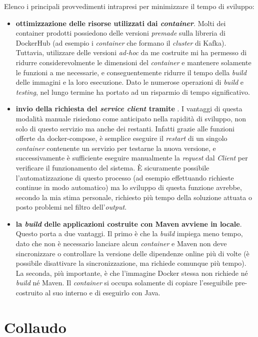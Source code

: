 \noindent
Elenco i principali provvedimenti intrapresi per minimizzare il tempo di sviluppo:
\begin{itemize}
  \item \textbf{ottimizzazione delle risorse utilizzati dai \textit{container}}.
  Molti dei container prodotti possiedono delle versioni \textit{premade} sulla libreria di DockerHub (ad esempio i \textit{container} che formano il \textit{cluster} di Kafka).
  Tuttavia, utilizzare delle versioni \textit{ad-hoc} da me costruite mi ha permesso di ridurre considerevolmente le dimensioni del \textit{container} e mantenere solamente le funzioni a me necessarie, e conseguentemente ridurre il tempo della \textit{build} delle immagini e la loro esecuzione. Dato le numerose operazioni di \textit{build} e \textit{testing}, nel lungo termine ha portato ad un risparmio di tempo significativo.
  \item \textbf{invio della richiesta  del \textit{service client} tramite }.
  I vantaggi di questa modalità manuale risiedono come anticipato nella rapidità di sviluppo, non solo di questo servizio ma anche dei restanti.
  Infatti grazie alle funzioni offerte da docker-compose, è semplice eseguire il \textit{restart} di un singolo \textit{container} contenente un servizio per testarne la nuova versione, e successivamente è sufficiente eseguire manualmente la \textit{request} dal  \textit{Client} per verificare il funzionamento del sistema.
  È sicuramente possibile l'automatizzazione di questo processo (ad esempio effettuando richieste continue in modo automatico) ma lo sviluppo di questa funzione avrebbe, secondo la mia stima personale, richiesto più tempo della soluzione attuata o posto problemi nel filtro dell'\textit{output}.
  \item \textbf{la \textit{build} delle applicazioni costruite con Maven avviene in locale}.
  Questo porta a due vantaggi.
  Il primo è che la \textit{build} impiega meno tempo, dato che non è necessario lanciare alcun \textit{container} e Maven non deve sincronizzare o controllare la versione delle dipendenze online più di volte (è possibile  disattivare la sincronizzazione, ma richiede comunque più tempo).
  La seconda, più importante, è che l'immagine Docker stessa non richiede né \textit{build} né Maven.
  Il \textit{container} si occupa solamente di copiare l'eseguibile pre-costruito al suo interno e di eseguirlo con Java.
\end{itemize}

\section{Collaudo}

